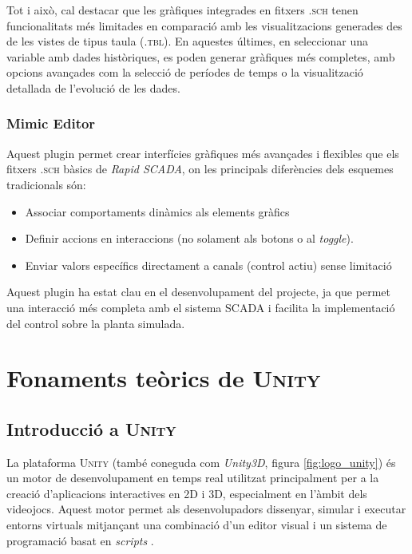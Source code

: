 \documentclass[a4paper,11pt,DIV=13,headings=normal,abstract=true,twoside=semi]{article}
\newcommand{\acro}[1]{\textsc{#1}}
\begin{document}
Tot i això, cal destacar que les gràfiques integrades en fitxers \acro{.sch} tenen funcionalitats més limitades en comparació amb les visualitzacions generades des de les vistes de tipus taula (\acro{.tbl}). En aquestes últimes, en seleccionar una variable amb dades històriques, es poden generar gràfiques més completes, amb opcions avançades com la selecció de períodes de temps o la visualització detallada de l'evolució de les dades.

\subsubsection*{Mimic Editor}

Aquest plugin permet crear interfícies gràfiques més avançades i flexibles que els fitxers \acro{.sch} bàsics de \emph{Rapid SCADA}, on les principals diferències dels esquemes tradicionals són:
\begin{itemize}
    \item Associar comportaments dinàmics als elements gràfics 
    \item Definir accions en interaccions (no solament als botons o al \emph{toggle}).
    \item Enviar valors específics directament a canals (control actiu) sense limitació
\end{itemize}


Aquest plugin ha estat clau en el desenvolupament del projecte, ja que permet una interacció més completa amb el sistema \acro{SCADA} i facilita la implementació del control sobre la planta simulada.

\newpage
\section{Fonaments teòrics de \acro{Unity}}
\label{sec:unity_theory}
\subsection{Introducció a \acro{Unity}}


La plataforma \acro{Unity} (també coneguda com \emph{Unity3D}, figura \ref{fig:logo_unity}) és un motor de desenvolupament en temps real utilitzat principalment per a la creació d'aplicacions interactives en 2D i 3D, especialment en l'àmbit dels videojocs. Aquest motor permet als desenvolupadors dissenyar, simular i executar entorns virtuals mitjançant una combinació d'un editor visual i un sistema de programació basat en \emph{scripts} \cite{Unity}.
\end{document}
